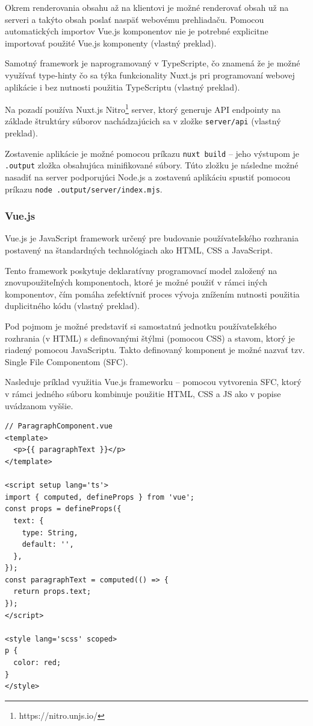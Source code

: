 Okrem renderovania obsahu až na klientovi je možné renderovať obsah už na serveri a takýto obsah poslať naspäť webovému prehliadaču. Pomocou automatických importov Vue.js komponentov nie je potrebné explicitne importovať použité Vue.js komponenty \cite{nuxt_introduction} (vlastný preklad).

Samotný framework je naprogramovaný v TypeScripte, čo znamená že je možné využívať type-hinty čo sa týka funkcionality Nuxt.js pri programovaní webovej aplikácie i bez nutnosti použitia TypeScriptu \cite{nuxt_introduction} (vlastný preklad).

Na pozadí používa Nuxt.js Nitro\footnote{https://nitro.unjs.io/} server, ktorý generuje API endpointy na základe štruktúry súborov nachádzajúcich sa v zložke \texttt{server/api} \cite{nuxt_introduction} (vlastný preklad).

Zostavenie aplikácie je možné pomocou príkazu \texttt{nuxt build} -- jeho výstupom je \texttt{.output} zložka obsahujúca minifikované súbory. Túto zložku je následne možné nasadiť na server podporujúci Node.js a zostavenú aplikáciu spustiť pomocou príkazu \texttt{node .output/server/index.mjs}.

\subsubsection {Vue.js}
Vue.js je JavaScript framework určený pre budovanie používateľského rozhrania postavený na štandardných technológiach ako HTML, CSS a JavaScript.

Tento framework poskytuje deklaratívny programovací model založený na znovupoužiteľných komponentoch, ktoré je možné použiť v rámci iných komponentov, čím pomáha zefektívniť proces vývoja znížením nutnosti použitia duplicitného kódu \cite{vuejs_introduction} (vlastný preklad).

Pod pojmom  je možné predstaviť si samostatnú jednotku používateľského rozhrania (v HTML) s definovanými štýlmi (pomocou CSS) a stavom, ktorý je riadený pomocou JavaScriptu.
Takto definovaný komponent je možné nazvať tzv. Single File Componentom (SFC).

Nasleduje príklad využitia Vue.js frameworku -- pomocou vytvorenia SFC, ktorý v rámci jedného súboru kombinuje použitie HTML, CSS a JS ako v popise uvádzanom vyššie.

\begin{minipage}[]{\linewidth}
\begin{verbatim}
// ParagraphComponent.vue
<template>
  <p>{{ paragraphText }}</p>
</template>

<script setup lang='ts'>
import { computed, defineProps } from 'vue';
const props = defineProps({
  text: {
    type: String,
    default: '',
  },
});
const paragraphText = computed(() => {
  return props.text;
});
</script>

<style lang='scss' scoped>
p {
  color: red;
}
</style>
\end{verbatim}
\end{minipage}

